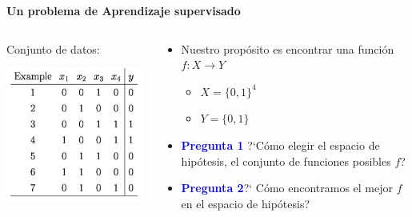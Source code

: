 \documentclass[11pt]{beamer}
\begin{document}
\begin{frame}{\textbf{\textcolor{green!55!blue}{Un problema de Aprendizaje supervisado}}}
\begin{columns}
	\begin{column}{0.5\textwidth}
	Conjunto de datos:
	
	\includegraphics[scale= 0.45]{ML6.png}
	\end{column}
	\begin{column}{0.5\textwidth}  
	\begin{itemize}
		\item Nuestro prop\'osito es encontrar una funci\'on $f: X \rightarrow Y$
		\begin{itemize}
		\item $X = \{0,1\}^4$
		\item $Y = \{0, 1\}$
		\end{itemize}
	\item \textbf{\textcolor{blue}{Pregunta 1}} ?`C\'omo elegir el espacio de  hip\'otesis, el conjunto de funciones posibles $f$?
	\item \textbf{\textcolor{blue}{Pregunta 2}}?` C\'omo encontramos el mejor $f$ en el espacio de  hip\'otesis? 
	\end{itemize}
	\end{column}
\end{columns}
\end{frame}
\end{document}

